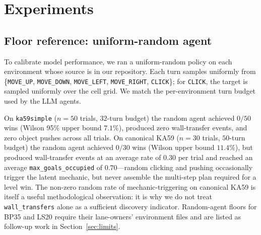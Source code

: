 \documentclass{article}
\begin{document}
\section{Experiments}
\label{sec:experiments}
\subsection{Floor reference: uniform-random agent}
\label{sec:random}
To calibrate model performance, we ran a uniform-random policy on each environment whose source is in our repository. Each turn samples uniformly from \{\texttt{MOVE\_UP}, \texttt{MOVE\_DOWN}, \texttt{MOVE\_LEFT}, \texttt{MOVE\_RIGHT}, \texttt{CLICK}\}; for \texttt{CLICK}, the target is sampled uniformly over the cell grid. We match the per-environment turn budget used by the LLM agents.

On \texttt{ka59simple} ($n{=}50$ trials, $32$-turn budget) the random agent achieved $0/50$ wins (Wilson 95\% upper bound $7.1\%$), produced zero wall-transfer events, and zero object pushes across all trials. On canonical KA59 ($n{=}30$ trials, $50$-turn budget) the random agent achieved $0/30$ wins (Wilson upper bound $11.4\%$), but produced wall-transfer events at an average rate of $0.30$ per trial and reached an average \texttt{max\_goals\_occupied} of $0.70$---random clicking and pushing occasionally trigger the latent mechanic, but never assemble the multi-step plan required for a level win. The non-zero random rate of mechanic-triggering on canonical KA59 is itself a useful methodological observation: it is why we do not treat \texttt{wall\_transfers} alone as a sufficient discovery indicator. Random-agent floors for BP35 and LS20 require their lane-owners' environment files and are listed as follow-up work in Section~\ref{sec:limits}.
\end{document}
